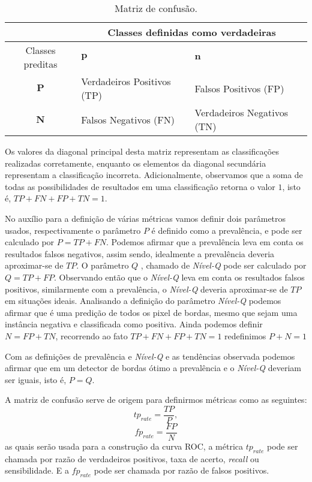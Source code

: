 \begin{table}[hbt]
	\centering
	\caption{Matriz de confusão.}\label{cap_fusao_tab01}
\begin{tabular}{@{}cll@{}} \toprule
	                        & \multicolumn{2}{c}{Classes definidas como verdadeiras}                              \\ \midrule
	 Classes preditas       & $\mathbf{p}$                       & $\mathbf{n}$                        \\
                         $\mathbf{P}$& Verdadeiros Positivos (TP) & Falsos Positivos (FP)      \\ 
	                     $\mathbf{N}$& Falsos Negativos (FN)      & Verdadeiros Negativos (TN) \\ \bottomrule 
\end{tabular}
\end{table}

Os valores da diagonal principal desta matriz representam as classificações realizadas corretamente, enquanto os elementos da diagonal secundária representam a classificação incorreta.
Adicionalmente, observamos que a soma de todas as possibilidades de resultados em uma classificação retorna o valor $1$, isto é, $TP+FN+FP+TN=1$.

No auxílio para a definição de várias métricas vamos definir dois parâmetros usados, respectivamente o parâmetro $P$ é definido como a prevalência, e pode ser calculado por $P=TP+FN$. Podemos afirmar que a prevalência leva em conta os resultados falsos negativos, assim sendo, idealmente a prevalência deveria aproximar-se de $TP$. 
O parâmetro $Q$ , chamado de \textit{Nível-Q} pode ser calculado por $Q=TP+FP$. 
Observando então que o \textit{Nível-Q} leva em conta os resultados falsos positivos, similarmente com a prevalência, 
o \textit{Nível-Q} deveria aproximar-se de $TP$ em situações ideais. 
Analisando a definição do parâmetro \textit{Nível-Q} podemos afirmar que  é uma predição de todos os pixel de bordas, mesmo que sejam uma instância negativa e classificada como positiva. 
Ainda podemos definir $N=FP+TN$, recorrendo ao fato $TP+FN+FP+TN=1$ redefinimos $P+N=1$  

Com as definições de prevalência e \textit{Nível-Q} e as tendências observada podemos afirmar que em um detector de bordas ótimo a prevalência e o \textit{Nível-Q} deveriam ser iguais, isto é, $P=Q$.

A matriz de confusão serve de origem para definirmos métricas como as seguintes:
\begin{equation}\label{cap_fusao_eq_01}
	tp_{rate}=\frac{TP}{P},
\end{equation}
\begin{equation}\label{cap_fusao_eq_02}
	fp_{rate}=\frac{FP}{N}
\end{equation}
as quais serão usada para a construção da curva ROC, a métrica $tp_{rate}$ pode ser chamada por razão de verdadeiros positivos, taxa de acerto, \textit{recall} ou  sensibilidade. 
E a $fp_{rate}$ pode ser chamada por razão de falsos positivos.

